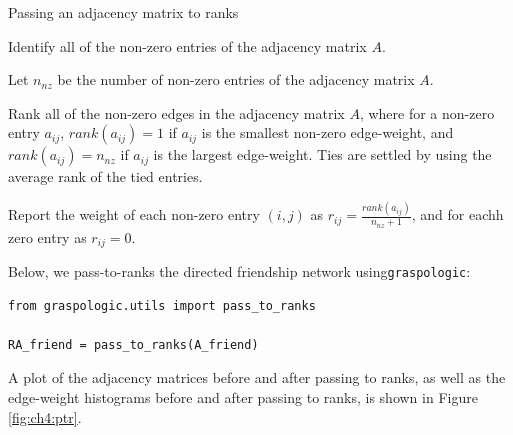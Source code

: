 \begin{algorithm}[h]
    \SetAlgoLined
\caption{Passing an adjacency matrix to ranks}
\label{alg:ch4:ptr}
    Identify all of the non-zero entries of the adjacency matrix $A$.

    Let $n_{nz}$ be the number of non-zero entries of the adjacency matrix $A$.

    Rank all of the non-zero edges in the adjacency matrix $A$, where for a non-zero entry $a_{ij}$, $rank(a_{ij}) = 1$ if $a_{ij}$ is the smallest non-zero edge-weight, and $rank(a_{ij}) = n_{nz}$ if $a_{ij}$ is the largest edge-weight. Ties are settled by using the average rank of the tied entries.

    Report the weight of each non-zero entry $(i,j)$ as $r_{ij} = \frac{rank(a_{ij})}{n_{nz} + 1}$, and for eachh zero entry as $r_{ij} = 0$.
\end{algorithm}

Below, we pass-to-ranks the directed friendship network using\texttt{graspologic}:

\begin{lstlisting}[style=python]
from graspologic.utils import pass_to_ranks

RA_friend = pass_to_ranks(A_friend)
\end{lstlisting}

A plot of the adjacency matrices before and after passing to ranks, as well as the edge-weight histograms before and after passing to ranks, is shown in Figure \ref{fig:ch4:ptr}.

